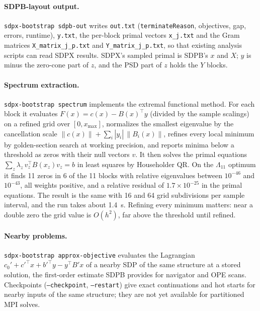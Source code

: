 \documentclass[11pt]{article}
\newcommand{\code}[1]{\texttt{#1}}
\begin{document}
\paragraph{SDPB-layout output.}
\code{sdpx-bootstrap sdpb-out} writes \code{out.txt}
(\code{terminateReason}, objectives, gap, errors, runtime), \code{y.txt},
the per-block primal vectors \code{x\_j.txt} and the Gram matrices
\code{X\_matrix\_j\_p.txt} and \code{Y\_matrix\_j\_p.txt}, so that existing
analysis scripts can read SDPX results. SDPX's sampled primal is SDPB's
$x$ and $X$; $y$ is minus the zero-cone part of $z$, and the PSD part of $z$
holds the $Y$ blocks.

\paragraph{Spectrum extraction.}
\code{sdpx-bootstrap spectrum} implements the extremal functional method.
For each block it evaluates $F(x) = c(x) - B(x)^\top y$ (divided by the
sample scalings) on a refined grid over $[0, x_{\max}]$, normalizes the
smallest eigenvalue by the cancellation scale $\|c(x)\| +
\sum_i |y_i|\,\|B_i(x)\|$, refines every local minimum by golden-section
search at working precision, and reports minima below a threshold as zeros
with their null vectors $v$. It then solves the primal equations
$\sum_z \lambda_z\, v_z^\top B(x_z) v_z = b$ in least squares by Householder
QR. On the $\Lambda_{11}$ optimum it finds 11 zeros in 6 of the 11 blocks
with relative eigenvalues between $10^{-46}$ and $10^{-43}$, all weights
positive, and a relative residual of $1.7\times10^{-25}$ in the primal
equations. The result is the same with 16 and 64 grid subdivisions per
sample interval, and the run takes about 1.4~s. Refining every minimum
matters: near a double zero the grid value is $O(h^2)$, far above the
threshold until refined.

\paragraph{Nearby problems.}
\code{sdpx-bootstrap approx-objective} evaluates the Lagrangian
$c_0' + c'^\top x + b'^\top y - y^\top B' x$ of a nearby SDP of the same
structure at a stored solution, the first-order estimate SDPB provides for
navigator and OPE scans. Checkpoints (\code{--checkpoint},
\code{--restart}) give exact continuations and hot starts for nearby inputs
of the same structure; they are not yet available for partitioned MPI
solves.

\end{document}
